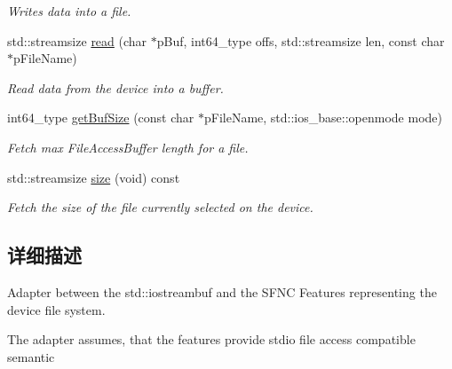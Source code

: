 \begin{DoxyCompactItemize}
\begin{DoxyCompactList}\small\item\em Writes data into a file. \end{DoxyCompactList}\item 
std\+::streamsize \hyperlink{classmv_i_m_p_a_c_t_1_1acquire_1_1_gen_i_cam_1_1_file_protocol_adapter_a37d4353bb8aa6f0b2d41a14c52eb2ab5}{read} (char $\ast$p\+Buf, int64\+\_\+type offs, std\+::streamsize len, const char $\ast$p\+File\+Name)
\begin{DoxyCompactList}\small\item\em Read data from the device into a buffer. \end{DoxyCompactList}\item 
int64\+\_\+type \hyperlink{classmv_i_m_p_a_c_t_1_1acquire_1_1_gen_i_cam_1_1_file_protocol_adapter_acb66bce933bb96624a3e3ae9427ec418}{get\+Buf\+Size} (const char $\ast$p\+File\+Name, std\+::ios\+\_\+base\+::openmode mode)
\begin{DoxyCompactList}\small\item\em Fetch max File\+Access\+Buffer length for a file. \end{DoxyCompactList}\item 
std\+::streamsize \hyperlink{classmv_i_m_p_a_c_t_1_1acquire_1_1_gen_i_cam_1_1_file_protocol_adapter_ae0c807ddd866348a2bcf9b8886640427}{size} (void) const 
\begin{DoxyCompactList}\small\item\em Fetch the size of the file currently selected on the device. \end{DoxyCompactList}\end{DoxyCompactItemize}


\subsection{详细描述}
Adapter between the std\+::iostreambuf and the S\+F\+N\+C Features representing the device file system. 

The adapter assumes, that the features provide stdio file access compatible semantic 

